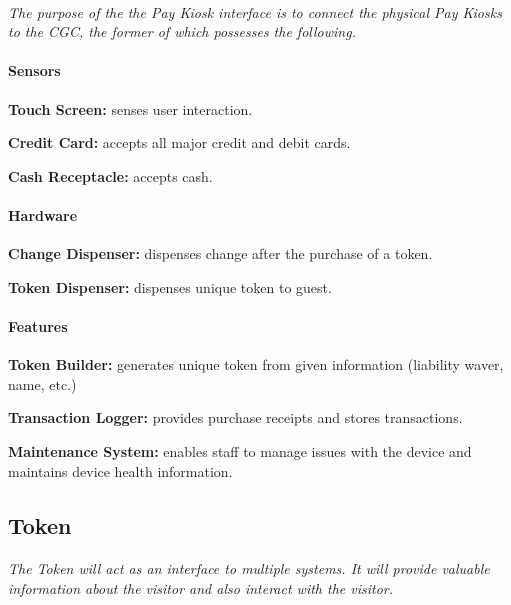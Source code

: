 \documentclass[12pt]{article}
\begin{document}
    \paragraph{} \textit{The purpose of the the Pay Kiosk interface is to connect 
    the physical Pay Kiosks to the CGC, the former of which possesses the following.}
    \paragraph{Sensors}
    \begin{list}{}{}
        \item \textbf{Touch Screen:} senses user interaction. 
        \item \textbf{Credit Card:} accepts all major credit and debit cards. 
        \item \textbf{Cash Receptacle:} accepts cash. 
    \end{list}
        
    \paragraph{Hardware}
    \begin{list}{}{}
        \item \textbf{Change Dispenser:} dispenses change after the purchase of a token.
        \item \textbf{Token Dispenser:} dispenses unique token to guest.
    \end{list}

    \paragraph{Features}
    \begin{list}{}{}
        \item \textbf{Token Builder:} generates unique token from given information (liability waver, name, etc.)
        \item \textbf{Transaction Logger:} provides purchase receipts and stores transactions.
        \item \textbf{Maintenance System:} enables staff to manage issues with the device    
        and maintains device health information. 
    \end{list}

    \subsection{Token}
    \paragraph{} \textit{The Token will act as an interface to multiple systems. 
    It will provide valuable information about the visitor and also interact with 
    the visitor.}
        
\end{document}
